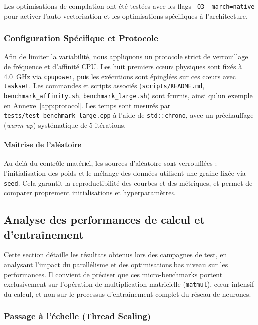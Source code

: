 \documentclass[a4paper,11pt]{article}
\begin{document}
Les optimisations de compilation ont été testées avec les flags \texttt{-O3 -march=native} pour activer l'auto-vectorisation et les optimisations spécifiques à l'architecture.

\subsubsection{Configuration Spécifique et Protocole}\label{subsec:protocol}

Afin de limiter la variabilité, nous appliquons un protocole strict de verrouillage de fréquence et d'affinité CPU. Les huit premiers cœurs physiques sont fixés à 4.0~GHz via \texttt{cpupower}, puis les exécutions sont épinglées sur ces cœurs avec \texttt{taskset}. Les commandes et scripts associés (\texttt{scripts/README.md}, \texttt{benchmark\_affinity.sh}, \texttt{benchmark\_large.sh}) sont fournis, ainsi qu'un exemple en Annexe~\ref{app:protocol}. Les temps sont mesurés par \texttt{tests/test\_benchmark\_large.cpp} à l'aide de \texttt{std::chrono}, avec un préchauffage (\emph{warm-up}) systématique de 5 itérations.

\paragraph{Maîtrise de l'aléatoire}
Au-delà du contrôle matériel, les sources d'aléatoire sont verrouillées : l'initialisation des poids et le mélange des données utilisent une graine fixée via \texttt{--seed}. Cela garantit la reproductibilité des courbes et des métriques, et permet de comparer proprement initialisations et hyperparamètres.

\subsection{Analyse des performances de calcul et d'entraînement}

Cette section détaille les résultats obtenus lors des campagnes de test, en analysant l'impact du parallélisme et des optimisations bas niveau sur les performances. Il convient de préciser que ces micro-benchmarks portent exclusivement sur l'opération de multiplication matricielle (\texttt{matmul}), cœur intensif du calcul, et non sur le processus d'entraînement complet du réseau de neurones.

\subsubsection{Passage à l'échelle (Thread Scaling)}
\end{document}
